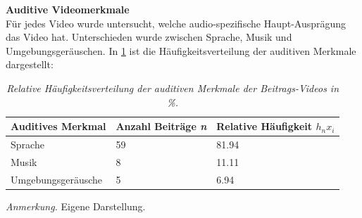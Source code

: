 \documentclass[12pt,a4paper]{article}        %
\begin{document}
\textbf{Auditive Videomerkmale}\\
Für jedes Video wurde untersucht, welche audio-spezifische Haupt-Ausprägung das Video hat. Unterschieden wurde zwischen Sprache, Musik und Umgebungsgeräuschen. In \ref{tab:results_auditive_specifications} ist die Häufigkeitsverteilung der auditiven Merkmale dargestellt:
\begin{table}[H]
  \caption{\textit{Relative Häufigkeitsverteilung der auditiven Merkmale der Beitrags-Videos in \%.}}
  \label{tab:results_auditive_specifications}
  \centering
  \begin{tabular}{|l|l|l|} \hline
    \textbf{Auditives Merkmal} & \textbf{Anzahl Beiträge \textit{n}}& \textbf{Relative Häufigkeit \({h_n}{x_i}\)} \\ \hline
    Sprache & 59 & 81.94 \\ \hline
    Musik & 8 & 11.11 \\ \hline
    Umgebungsgeräusche & 5 & 6.94 \\ \hline
  \end{tabular}
  \footnotesize\textit{Anmerkung.} Eigene Darstellung.
\end{table}
\end{document}
